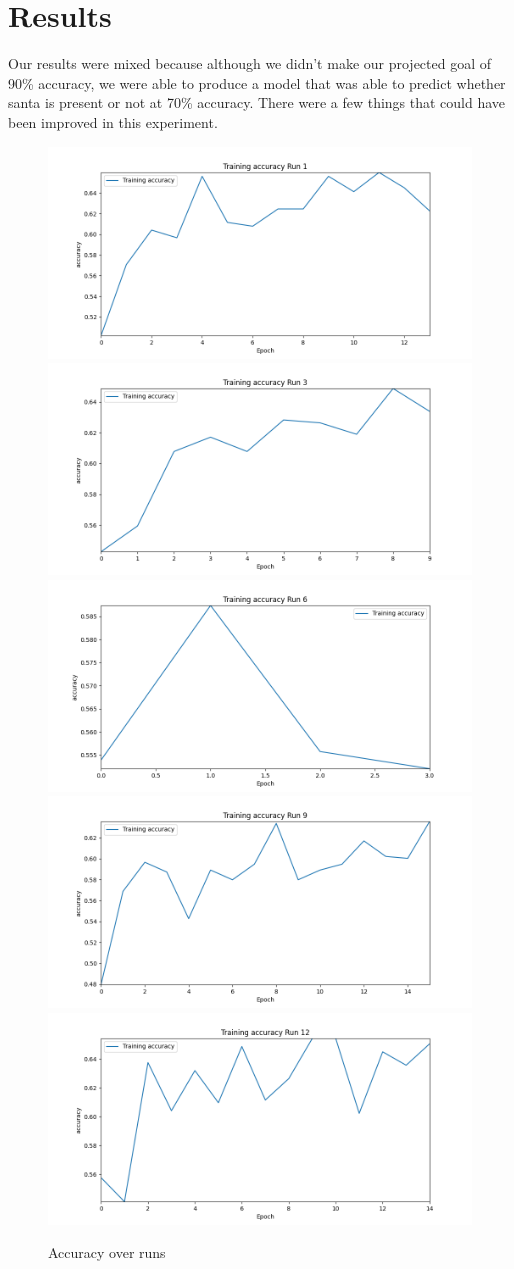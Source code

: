 \section{Results}
Our results were mixed because although we didn't make our projected goal of 90\% accuracy, we were able to 
produce a model that was able to predict whether santa is present or not at 70\% accuracy. There were a few things that could have been improved in this experiment. 

\begin{figure}[h]
    \centering
    \includegraphics[width=0.30\linewidth]{img/training_accuracy_run_1.png}
    \includegraphics[width=0.30\linewidth]{img/training_accuracy_run_3.png}
    \includegraphics[width=0.30\linewidth]{img/training_accuracy_run_6.png}
    \includegraphics[width=0.30\linewidth]{img/training_accuracy_run_9.png}
    \includegraphics[width=0.30\linewidth]{img/training_accuracy_run_12.png}
    \caption{Accuracy over runs}
    \label{fig:result2}
\end{figure}

